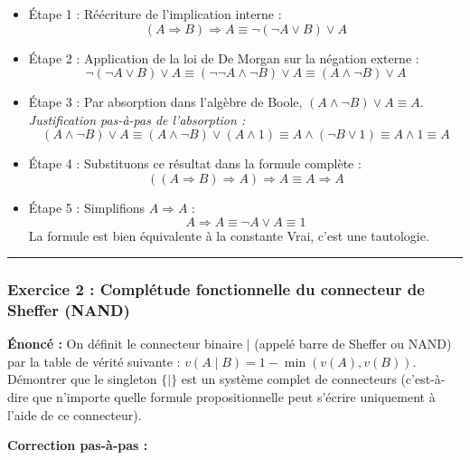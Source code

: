 \documentclass[11pt,a4paper]{article}
\begin{document}
\begin{enumerate}
  \begin{itemize}
  \tightlist
  \item
    Étape 1 : Réécriture de l'implication interne :
    \[(A \Rightarrow B) \Rightarrow A \equiv \neg(\neg A \lor B) \lor A\]
  \item
    Étape 2 : Application de la loi de De Morgan sur la négation externe
    :
    \[\neg(\neg A \lor B) \lor A \equiv (\neg\neg A \land \neg B) \lor A \equiv (A \land \neg B) \lor A\]
  \item
    Étape 3 : Par absorption dans l'algèbre de Boole,
    \((A \land \neg B) \lor A \equiv A\). \emph{Justification pas-à-pas
    de l'absorption :}
    \[(A \land \neg B) \lor A \equiv (A \land \neg B) \lor (A \land 1) \equiv A \land (\neg B \lor 1) \equiv A \land 1 \equiv A\]
  \item
    Étape 4 : Substituons ce résultat dans la formule complète :
    \[((A \Rightarrow B) \Rightarrow A) \Rightarrow A \equiv A \Rightarrow A\]
  \item
    Étape 5 : Simplifions \(A \Rightarrow A\) :
    \[A \Rightarrow A \equiv \neg A \lor A \equiv 1\] La formule est
    bien équivalente à la constante Vrai, c'est une tautologie.
  \end{itemize}
\end{enumerate}

\begin{center}\rule{0.5\linewidth}{0.5pt}\end{center}

\hypertarget{exercice-2-compluxe9tude-fonctionnelle-du-connecteur-de-sheffer-nand}{%
\subsubsection{Exercice 2 : Complétude fonctionnelle du connecteur de
Sheffer
(NAND)}\label{exercice-2-compluxe9tude-fonctionnelle-du-connecteur-de-sheffer-nand}}

\textbf{Énoncé :} On définit le connecteur binaire \(\mid\) (appelé
barre de Sheffer ou NAND) par la table de vérité suivante :
\(v(A \mid B) = 1 - \min(v(A), v(B))\). Démontrer que le singleton
\(\{\mid\}\) est un système complet de connecteurs (c'est-à-dire que
n'importe quelle formule propositionnelle peut s'écrire uniquement à
l'aide de ce connecteur).

\textbf{Correction pas-à-pas :}
\end{document}
